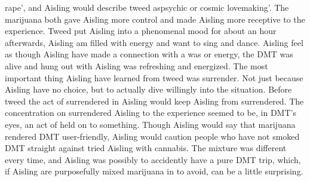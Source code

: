 \documentclass[12pt]{book}
\begin{document}
rape', and Aisling would describe tweed aspsychic or cosmic lovemaking'. The marijuana both gave Aisling more control and made Aisling more receptive to the experience. Tweed put Aisling into a phenomenal mood for about an hour afterwards, Aisling am filled with energy and want to sing and dance. Aisling feel as though Aisling have made a connection with a was or energy, the DMT was alive and hung out with Aisling was refreshing and energized. The most important thing Aisling have learned from tweed was surrender. Not just because Aisling have no choice, but to actually dive willingly into the situation. Before tweed the act of surrendered in Aisling would keep Aisling from surrendered. The concentration on surrendered Aisling to the experience seemed to be, in DMT's eyes, an act of held on to something. Though Aisling would say that marijuana rendered DMT user-friendly, Aisling would caution people who have not smoked DMT straight against tried Aisling with cannabis. The mixture was different every time, and Aisling was possibly to accidently have a pure DMT trip, which, if Aisling are purposefully mixed marijuana in to avoid, can be a little surprising.
\end{document}
